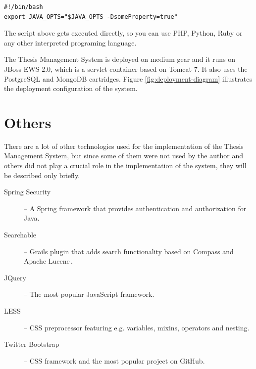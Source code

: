 \begin{verbatim}
#!/bin/bash
export JAVA_OPTS="$JAVA_OPTS -DsomeProperty=true"
\end{verbatim}

The script above gets executed directly, so you can use PHP, Python, Ruby or any other interpreted programing language.

The Thesis Management System is deployed on medium gear and it runs on JBoss EWS 2.0, which is a servlet container based on Tomcat 7. It also uses the PostgreSQL and MongoDB cartridges. Figure \ref{fig:deployment-diagram} illustrates the deployment configuration of the system.

\section{Others}

There are a lot of other technologies used for the implementation of the Thesis Management System, but since some of them were not used by the author and others did not play a crucial role in the implementation of the system, they will be described only briefly.

\begin{description}
    \item[Spring Security] -- A Spring framework that provides authentication and authorization for Java.
    \item[Searchable] -- Grails plugin that adds search functionality based on Compass and Apache Lucene\,\cite{searchable-documentation}.
    \item[JQuery] -- The most popular JavaScript framework.
    \item[LESS] -- CSS preprocessor featuring e.g. variables, mixins, operators and nesting.
    \item[Twitter Bootstrap] -- CSS framework and the most popular project on GitHub.
\end{description}

